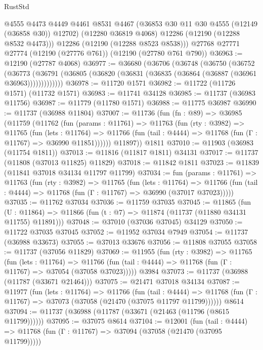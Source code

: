 \begin{lexlean}{RustStd}
\begin{coremodule}
        @4555
        @4473
        @4449
        @4461
        @8531
        @4467
        (@36853 @30 @11 @30 @4555 (@12149 (@36858 @30)) @12702)
        (@12280 @36819 @4068)
        @12286
        (@12190 (@12288 @8532 @4473)))
      @12286
      (@12190 (@12288 @8523 @8538)))
    @27768
    @27771
    @27774
    (@12190 (@27776 @761))
    (@12190 (@27780 @761 @790))
@36963 := @12190 (@27787 @4068)
@36977 := @36680
    (@36706
      (@36748
        (@36750
          (@36752
            (@36773
              (@36791 (@36805 (@36820 (@36831 (@36835 (@36864 (@36887 (@36961 @36963)))))))))))))
@36978 := @11720 @1571
@36982 := @11722 (@11726 @1571) (@11732 @1571)
@36983 := @11741 @34128
@36985 := @11737 (@36983 @11756)
@36987 := @11779 (@11780 @1571)
@36988 := @11775 @36987
@36990 := @11737 (@36988 @11804)
@37007 := @11736
    (fun (fn : @89) =>
    @36985
      (@11759
        (@11762
          (fun (params : @11761) =>
          @11763
            (fun (rty : @3982) =>
            @11765
              (fun (lets : @11764) =>
              @11766 (fun (tail : @4444) => @11768 (fun (Γ : @11767) => @36990 @11851))))))
        @11897))
    @1811
@37010 := @11903 (@36983 (@11754 @1811))
@37013 := @11816 (@11817 @1811) @34131
@37017 := @11737 (@11808 (@37013 @11825) @11829)
@37018 := @11842 @1811
@37023 := @11839 (@11841 @37018 @34134 @11797 @11799)
@37034 := fun (params : @11761) =>
  @11763
    (fun (rty : @3982) =>
    @11765
      (fun (lets : @11764) =>
      @11766 (fun (tail : @4444) => @11768 (fun (Γ : @11767) => @36990 (@37017 @37023)))))
@37035 := @11762 @37034
@37036 := @11759 @37035
@37045 := @11865
    (fun (U : @11864) => @11866 (fun (t : @7) => @11874 (@11737 (@11880 @34131 @11755) @11891)))
@37048 := @37010 (@37036 @37045) @34129
@37050 := @11722 @37035 @37045
@37052 := @11952 @37034 @7949
@37054 := @11737 (@36988 @33673)
@37055 := @37013 @33676
@37056 := @11808 @37055
@37058 := @11737 (@37056 @11829)
@37069 := @11955
    (fun (rty : @3982) =>
    @11765
      (fun (lets : @11764) =>
      @11766 (fun (tail : @4444) => @11768 (fun (Γ : @11767) => @37054 (@37058 @37023)))))
    @3984
@37073 := @11737 (@36988 (@11787 (@33671 @21464)))
@37075 := @21471 @37018 @34134
@37087 := @11977
    (fun (lets : @11764) =>
    @11766
      (fun (tail : @4444) =>
      @11768 (fun (Γ : @11767) => @37073 (@37058 (@21470 (@37075 @11797 @11799))))))
    @8614
@37094 := @11737 (@36988 (@11787 (@33671 (@21463 (@11796 (@8615 @11799))))))
@37095 := @37075 @8614
@37104 := @12001
    (fun (tail : @4444) => @11768 (fun (Γ : @11767) => @37094 (@37058 (@21470 (@37095 @11799)))))

\end{coremodule}
\end{lexlean}
